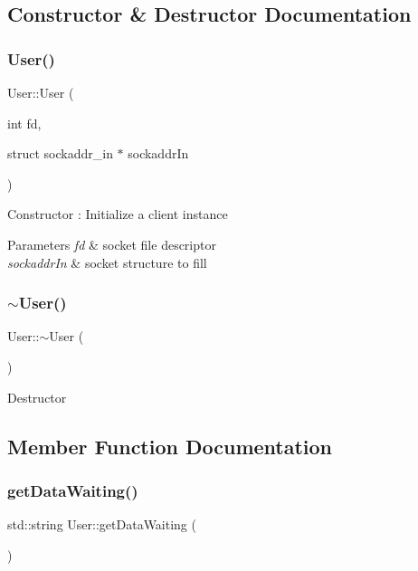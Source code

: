 \subsection{Constructor \& Destructor Documentation}
\mbox{\label{classUser_ade435ecd7d7f5e673b0fb05eb42697f1}} 
\subsubsection{\texorpdfstring{User()}{User()}}
{\footnotesize\ttfamily User\+::\+User (\begin{DoxyParamCaption}\item[{int}]{fd,  }\item[{struct sockaddr\+\_\+in $\ast$}]{sockaddr\+In }\end{DoxyParamCaption})}

Constructor \+: Initialize a client instance 
\begin{DoxyParams}{Parameters}
{\em fd} & socket file descriptor \\
\hline
{\em sockaddr\+In} & socket structure to fill \\
\hline
\end{DoxyParams}
\mbox{\label{classUser_ac00b72ad64eb4149f7b21b9f5468c2b2}} 
\subsubsection{\texorpdfstring{$\sim$\+User()}{~User()}}
{\footnotesize\ttfamily User\+::$\sim$\+User (\begin{DoxyParamCaption}{ }\end{DoxyParamCaption})}

Destructor 

\subsection{Member Function Documentation}
\mbox{\label{classUser_a790cbfc550e023e18927801a275830a8}} 
\subsubsection{\texorpdfstring{get\+Data\+Waiting()}{getDataWaiting()}}
{\footnotesize\ttfamily std\+::string User\+::get\+Data\+Waiting (\begin{DoxyParamCaption}{ }\end{DoxyParamCaption})\hspace{0.3cm}{\ttfamily [inline]}}


